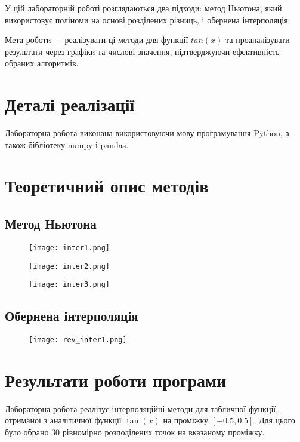 \documentclass[a4paper, 12pt]{article}
\begin{document}
У цій лабораторній роботі розглядаються два підходи: метод Ньютона, який використовує поліноми на основі розділених різниць, і обернена інтерполяція.

Мета роботи — реалізувати ці методи для функції $tan(x)$ та проаналізувати результати через графіки та числові значення, підтверджуючи ефективність обраних алгоритмів.

\section{Деталі реалізації}

Лабораторна робота виконана використовуючи мову програмування Python, а також бібліотеку numpy і pandas.

\clearpage
\section{Теоретичний опис методів}
\subsection{Метод Ньютона}

\begin{figure}[ht]
	\centering
	\texttt{[image: inter1.png]}
\end{figure}
\begin{figure}[ht]
	\centering
	\texttt{[image: inter2.png]}
\end{figure}

\begin{figure}[ht]
	\centering
	\texttt{[image: inter3.png]}
\end{figure}
\clearpage
\newpage

\newpage

\subsection{Обернена інтерполяція}

\begin{figure}[ht]
	\centering
	\texttt{[image: rev\_inter1.png]}
\end{figure}

\newpage
\section{Результати роботи програми}

Лабораторна робота реалізує інтерполяційні методи для табличної функції, отриманої з аналітичної функції \( \tan(x) \) на проміжку \([-0.5, 0.5]\). Для цього було обрано 30 рівномірно розподілених точок на вказаному проміжку. 
\end{document}
